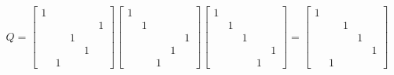 \documentclass[10pt]{article}
\begin{document}
\begin{solution}[Solution]
\begin{enumerate}
    {\footnotesize
        \begin{align*}
        Q = 
       \left[\begin{array}{rrrrr}
            1 \\
            & & & & 1 \\
            & & 1 \\
            & & & 1 \\
            & 1 
       \end{array}\right]
       \left[\begin{array}{rrrrr}
            1 \\
            & 1 \\
            & & & & 1 \\
            & & & 1 \\
            & & 1 
       \end{array}\right]
       \left[\begin{array}{rrrrr}
            1 \\
            & 1 \\
            & & 1 \\
            & & & & 1 \\
            & & & 1 
       \end{array}\right]
        =
       \left[\begin{array}{rrrrr}
            1 \\
            & & 1 \\
            & & & 1 \\
            & & & & 1 \\
            & 1 
       \end{array}\right]
     \end{align*}
     }


\end{enumerate}
\end{solution}
\end{document}
